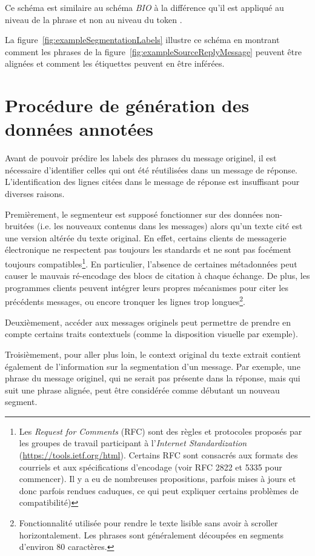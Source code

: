 Ce schéma est similaire au schéma \emph{BIO} à la différence qu'il est appliqué au niveau de la phrase et non au niveau du token \cite{ratinov:2009:conll}.

La figure~\ref{fig:exampleSegmentationLabels} illustre ce schéma en montrant comment les phrases de la figure~\ref{fig:exampleSourceReplyMessage} peuvent être alignées et comment les étiquettes peuvent en être inférées.

\section{Procédure de génération des données annotées}

Avant de pouvoir prédire les labels des phrases du message originel, il est nécessaire d'identifier celles qui ont été réutilisées dans un message de réponse. L'identification des lignes citées dans le message de réponse est insuffisant pour diverses raisons.

Premièrement, le segmenteur est supposé fonctionner sur des données non-bruitées (i.e. les nouveaux contenus dans les messages) alors qu'un texte cité est une version altérée du texte original. En effet, certains clients de messagerie électronique ne respectent pas toujours les standards et ne sont pas focément toujours compatibles\footnote{Les \textit{Request for Comments} (RFC) sont des règles et protocoles proposés par les groupes de travail participant à l'\textit{Internet Standardization} (\url{https://tools.ietf.org/html}). Certains RFC sont consacrés aux formats des courriels et aux spécifications d'encodage (voir RFC 2822 et 5335 pour commencer). Il y a eu de nombreuses propositions, parfois mises à jours et donc parfois rendues caduques, ce qui peut expliquer certains problèmes de compatibilité)}. En particulier, l'absence de certaines métadonnées peut causer le mauvais ré-encodage des blocs de citation à chaque échange. De plus, les programmes clients peuvent intégrer leurs propres mécanismes pour citer les précédents messages, ou encore tronquer les lignes trop longues\footnote{Fonctionnalité utilisée pour rendre le texte lisible sans avoir à scroller horizontalement. Les phrases sont généralement découpées en segments d'environ 80 caractères.}.

Deuxièmement, accéder aux messages originels peut permettre de prendre en compte certains traits contextuels (comme la disposition visuelle par exemple).

Troisièmement, pour aller plus loin, le context original du texte extrait contient également de l'information sur la segmentation d'un message. Par exemple, une phrase du message originel, qui ne serait pas présente dans la réponse, mais qui suit une phrase alignée, peut être considérée comme débutant un nouveau segment.

